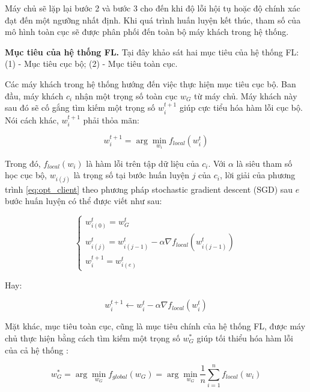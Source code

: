 Máy chủ sẽ lặp lại bước 2 và bước 3 cho đến khi độ lỗi hội tụ hoặc độ chính xác đạt đến một ngưỡng nhất định. Khi quá trình huấn luyện kết thúc, tham số của mô hình toàn cục sẽ được phân phối đến toàn bộ máy khách trong hệ thống.

\label{purpose_fl}
\textbf{Mục tiêu của hệ thống FL.} Tại đây khảo sát hai mục tiêu của hệ thống FL: (1) - Mục tiêu cục bộ; (2) - Mục tiêu toàn cục.

Các máy khách trong hệ thống hướng đến việc thực hiện mục tiêu cục bộ. Ban đầu, máy khách $c_i$ nhận một trọng số toàn cục $w_G$ từ máy chủ. Máy khách này sau đó sẽ cố gắng tìm kiếm một trọng số $w_i^{t+1}$ giúp cực tiểu hóa hàm lỗi cục bộ. Nói cách khác, $w_i^{t+1}$ phải thỏa mãn:

\begin{equation}
    \label{eq:opt_client}
    w_i^{t+1} = \arg\min_{w_i}{f_{local}(w_i^t)}
\end{equation}

Trong đó, $f_{local}(w_i)$ là hàm lỗi trên tập dữ liệu của $c_i$. Với $\alpha$ là siêu tham số học cục bộ, $w_{i(j)}$ là trọng số tại bước huấn luyện $j$ của $c_i$, lời giải của phương trình \ref{eq:opt_client} theo phương pháp stochastic gradient descent (SGD) sau $e$ bước huấn luyện có thể được viết như sau:

\begin{equation}
    \begin{cases}
        w_{i(0)}^t = w_G^t\\
        w_{i(j)}^t = w_{i(j-1)}^t - \alpha \nabla f_{local}(w_{i(j-1)}^t)\\
        w_i^{t+1} = w_{i(e)}^t
    \end{cases}
\end{equation}

Hay:

\begin{dmath}
    w_i^{t+1} \leftarrow w_i^t - \alpha\nabla f_{local}(w_i^t)
\end{dmath}

Mặt khác, mục tiêu toàn cục, cũng là mục tiêu chính của hệ thống FL, được máy chủ thực hiện bằng cách tìm kiếm một trọng số $w_G^*$ giúp tối thiểu hóa hàm lỗi của cả hệ thống \cite{yin2021comprehensive}:

\begin{dmath}
    \label{eq:opt_server}
    w_G^* = \arg \min_{w_G}{f_{global}(w_G)}
        = \arg \min_{w_G}{\frac{1}{n} \sum_{i=1}^n{f_{local}(w_i)}}
\end{dmath}

